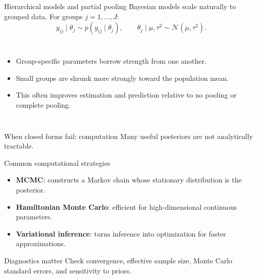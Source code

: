 \documentclass[aspectratio=169]{beamer}
\newcommand{\Normal}{\mathcal{N}}
\begin{document}
\begin{frame}{Hierarchical models and partial pooling}
Bayesian models scale naturally to grouped data. For groups $j=1,\dots,J$:
\[
  y_{ij}\mid\theta_j \sim p(y_{ij}\mid\theta_j),
  \qquad
  \theta_j\mid\mu,\tau^2 \sim \Normal(\mu,\tau^2).
\]

\begin{columns}[T,onlytextwidth]
\begin{itemize}
  \item Group-specific parameters borrow strength from one another.
  \item Small groups are shrunk more strongly toward the population mean.
  \item This often improves estimation and prediction relative to no pooling or complete pooling.
\end{itemize}

\centering
{}
\end{columns}
\end{frame}

\begin{frame}{When closed forms fail: computation}
Many useful posteriors are not analytically tractable.

\begin{block}{Common computational strategies}
\begin{itemize}
  \item \textbf{MCMC}: constructs a Markov chain whose stationary distribution is the posterior.
  \item \textbf{Hamiltonian Monte Carlo}: efficient for high-dimensional continuous parameters.
  \item \textbf{Variational inference}: turns inference into optimization for faster approximations.
\end{itemize}
\end{block}

\begin{block}{Diagnostics matter}
Check convergence, effective sample size, Monte Carlo standard errors, and sensitivity to priors.
\end{block}
\end{frame}
\end{document}
